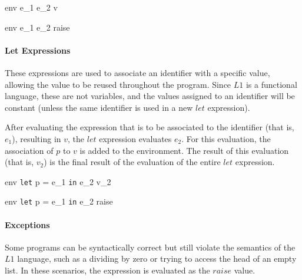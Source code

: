 \documentclass{article}
\begin{document}
    {\mbox{env} \vdash e_1 \; e_2 \Downarrow v}

    {\mbox{env} \vdash e_1 \; e_2 \Downarrow raise}

\paragraph{Let Expressions}
These expressions are used to associate an identifier with a specific value, allowing the value to be reused throughout the program.
Since $L1$ is a functional language, these are not variables, and the values assigned to an identifier will be constant (unless the same identifier is used in a new $let$ expression).

After evaluating the expression that is to be associated to the identifier (that is, $e_1$), resulting in $v$, the $let$ expression evaluates $e_2$.
For this evaluation, the association of $p$ to $v$ is added to the environment.
The result of this evaluation (that is, $v_2$) is the final result of the evaluation of the entire $let$ expression.

    {\mbox{env} \vdash \texttt{let} \; p = e_1 \; \texttt{in} \; e_2 \Downarrow v_2}

    {\mbox{env} \vdash \texttt{let} \; p = e_1 \; \texttt{in} \; e_2 \Downarrow raise}

\bigskip

\paragraph{Exceptions}

Some programs can be syntactically correct but still violate the semantics of the $L1$ language, such as a dividing by zero or trying to access the head of an empty list.
In these scenarios, the expression is evaluated as the $raise$ value.
\end{document}
